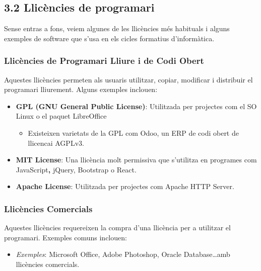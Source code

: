 \documentclass[
  12 pt,
  a4paper,
]{article}
\providecommand{\tightlist}{%
  \setlength{\itemsep}{0pt}\setlength{\parskip}{0pt}}
\begin{document}
\subsection{3.2 Llicències de
programari}\label{llicuxe8ncies-de-programari}

Sense entras a fons, veiem algunes de les llicències més habituals i
alguns exemples de software que s'usa en els cicles formatius
d'informàtica.

\subsubsection{Llicències de Programari Lliure i de Codi
Obert}\label{llicuxe8ncies-de-programari-lliure-i-de-codi-obert}

Aquestes llicències permeten als usuaris utilitzar, copiar, modificar i
distribuir el programari lliurement. Alguns exemples inclouen:

\begin{itemize}
\tightlist
\item
  \textbf{GPL (GNU General Public License)}: Utilitzada per projectes
  com el SO Linux o el paquet LibreOffice

  \begin{itemize}
  \tightlist
  \item
    Existeixen varietats de la GPL com Odoo, un ERP de codi obert de
    llicencai AGPLv3.
  \end{itemize}
\item
  \textbf{MIT License}: Una llicència molt permissiva que s'utilitza en
  programes com JavaScript\textbf{, }jQuery, Bootstrap o React.
\item
  \textbf{Apache License}: Utilitzada per projectes com Apache HTTP
  Server.
\end{itemize}

\subsubsection{Llicències Comercials}\label{llicuxe8ncies-comercials}

Aquestes llicències requereixen la compra d'una llicència per a
utilitzar el programari. Exemples comuns inclouen:

\begin{itemize}
\tightlist
\item
  \emph{Exemples}: Microsoft Office, Adobe Photoshop, Oracle
  Database\ldots amb llicències comercials.
\end{itemize}
\end{document}
